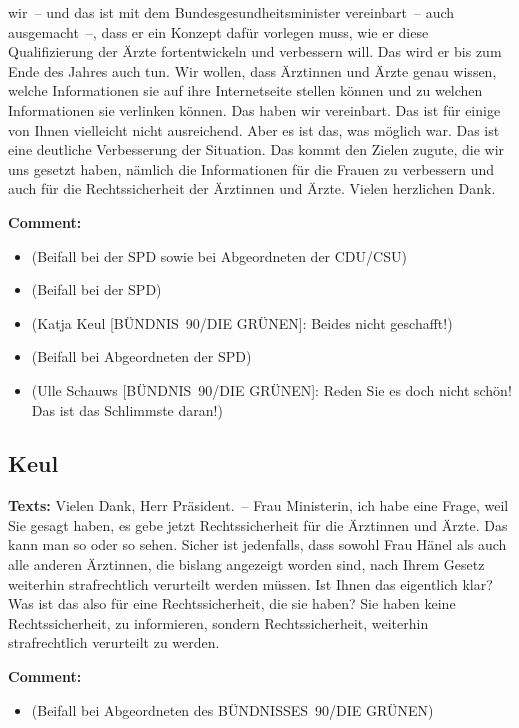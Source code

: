 \documentclass{article}
\begin{document}
wir – und das ist mit dem Bundesgesundheitsminister vereinbart – auch ausgemacht –, dass er ein Konzept dafür vorlegen muss, wie er diese Qualifizierung der Ärzte fortentwickeln und verbessern will. Das wird er bis zum Ende des Jahres auch tun.  Wir wollen, dass Ärztinnen und Ärzte genau wissen, welche Informationen sie auf ihre Internetseite stellen können und zu welchen Informationen sie verlinken können. Das haben wir vereinbart. Das ist für einige von Ihnen vielleicht nicht ausreichend. Aber es ist das, was möglich war. Das ist eine deutliche Verbesserung der Situation.  Das kommt den Zielen zugute, die wir uns gesetzt haben, nämlich die Informationen für die Frauen zu verbessern und auch für die Rechtssicherheit der Ärztinnen und Ärzte. Vielen herzlichen Dank. 

\noindent\textbf{Comment:}
\begin{itemize}
    \setlength\itemsep{-3pt}
    \item (Beifall bei der SPD sowie bei Abgeordneten der CDU/CSU)
    \setlength\itemsep{-3pt}
    \item (Beifall bei der SPD)
    \setlength\itemsep{-3pt}
    \item (Katja Keul [BÜNDNIS 90/DIE GRÜNEN]: Beides nicht geschafft!)
    \setlength\itemsep{-3pt}
    \item (Beifall bei Abgeordneten der SPD)
    \setlength\itemsep{-3pt}
    \item (Ulle Schauws [BÜNDNIS 90/DIE GRÜNEN]: Reden Sie es doch nicht schön! Das ist das Schlimmste daran!)
\end{itemize}
\subsection{Keul}
\noindent\textbf{Texts:} Vielen Dank, Herr Präsident. – Frau Ministerin, ich habe eine Frage, weil Sie gesagt haben, es gebe jetzt Rechtssicherheit für die Ärztinnen und Ärzte. Das kann man so oder so sehen. Sicher ist jedenfalls, dass sowohl Frau Hänel als auch alle anderen Ärztinnen, die bislang angezeigt worden sind, nach Ihrem Gesetz weiterhin strafrechtlich verurteilt werden müssen. Ist Ihnen das eigentlich klar? Was ist das also für eine Rechtssicherheit, die sie haben? Sie haben keine Rechtssicherheit, zu informieren, sondern Rechtssicherheit, weiterhin strafrechtlich verurteilt zu werden. 

\noindent\textbf{Comment:}
\begin{itemize}
    \setlength\itemsep{-3pt}
    \item (Beifall bei Abgeordneten des BÜNDNISSES 90/DIE GRÜNEN)
\end{itemize}
\end{document}
